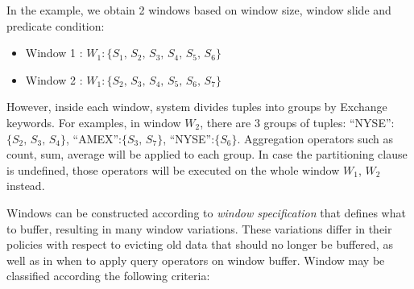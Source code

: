 In the example, we obtain 2 windows based on window size, window slide and predicate condition: 
\begin{itemize}
	\item Window 1 : $W_1:\{S_1,\,S_2,\,S_3,\,S_4,\,S_5,\,S_6\}$
	\item Window 2 : $W_1:\{S_2,\,S_3,\,S_4,\,S_5,\,S_6,\,S_7\}$
\end{itemize}
However, inside each window, system divides tuples into groups by Exchange keywords. For examples, in window $W_2$, there are 3 groups of tuples: ``NYSE'':$\{S_2,\,S_3,\,S_4\}$, ``AMEX'':$\{S_3,\,S_7\}$, ``NYSE'':$\{S_6\}$. Aggregation operators such as count, sum, average will be applied to each group. In case the partitioning clause is undefined, those operators will be executed on the whole window $W_1$, $W_2$ instead.
 
Windows can be constructed according to \textit{window specification} that defines what to buffer, resulting in many window variations. These variations differ in their policies with respect to evicting old data that should no longer be buffered, as well as in when to apply query operators on window buffer. Window may be classified according the following criteria:

